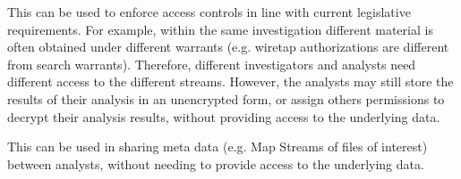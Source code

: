 \documentclass[10pt, conference]{IEEEtran}
\begin{document}
This can be used to enforce access controls in line with current
legislative requirements. For example, within the same investigation
different material is often obtained under different warrants
(e.g. wiretap authorizations are different from search
warrants). Therefore, different investigators and analysts need
different access to the different streams. However, the analysts may
still store the results of their analysis in an unencrypted form, or
assign others permissions to decrypt their analysis results, without
providing access to the underlying data. 

This can be used in sharing meta data (e.g. Map Streams of files of
interest) between analysts, without needing to provide access to the
underlying data.




\end{document}
